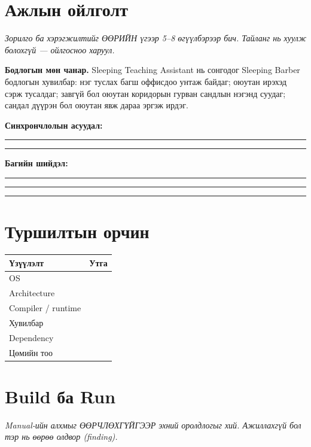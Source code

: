 \documentclass[11pt,a4paper]{article}
\begin{document}
\section{Ажлын ойлголт}
\emph{Зорилго ба хэрэгжилтийг ӨӨРИЙН үгээр 5--8 өгүүлбэрээр бич.
Тайланг нь хуулж болохгүй --- ойлгосноо харуул.}

\textbf{Бодлогын мөн чанар.} Sleeping Teaching Assistant нь сонгодог
Sleeping Barber бодлогын хувилбар: нэг туслах багш оффисдоо унтаж байдаг;
оюутан ирэхэд сэрж тусалдаг; завгүй бол оюутан коридорын гурван сандлын
нэгэнд суудаг; сандал дүүрэн бол оюутан явж дараа эргэж ирдэг.

\textbf{Синхрончлолын асуудал:}\\[3mm]
\noindent\rule{\textwidth}{0.4pt}

\vspace{2mm}\noindent\rule{\textwidth}{0.4pt}

\textbf{Багийн шийдэл:}\\[3mm]
\noindent\rule{\textwidth}{0.4pt}

\vspace{2mm}\noindent\rule{\textwidth}{0.4pt}

\vspace{2mm}\noindent\rule{\textwidth}{0.4pt}

\section{Туршилтын орчин}
\begin{center}
\small
\begin{tabular}{lL{9.5cm}}
\toprule
Үзүүлэлт & Утга \\
\midrule
OS & \\
Architecture & \\
Compiler / runtime & \\
Хувилбар & \\
Dependency & \\
Цөмийн тоо & \\
\bottomrule
\end{tabular}
\end{center}

\section{Build ба Run}
\emph{Manual-ийн алхмыг ӨӨРЧЛӨХГҮЙГЭЭР эхний оролдлогыг хий. Ажиллахгүй бол
тэр нь өөрөө олдвор (finding).}
\end{document}
